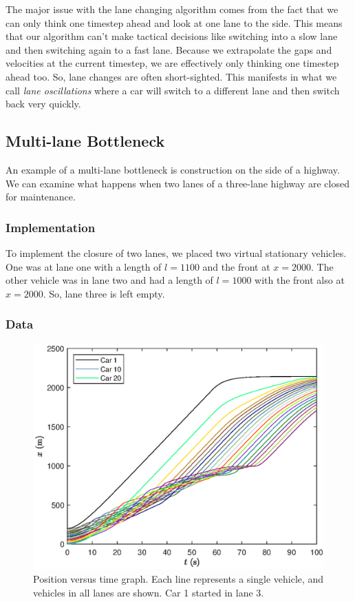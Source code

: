 \documentclass[12pt]{article}
\begin{document}
    The major issue with the lane changing algorithm comes from the fact that we can only think one timestep ahead and look at one lane to the side. This means that our algorithm can't make tactical decisions like switching into a slow lane and then switching again to a fast lane. Because we extrapolate the gaps and velocities at the current timestep, we are effectively only thinking one timestep ahead too. So, lane changes are often short-sighted. This manifests in what we call \textit{lane oscillations} where a car will switch to a different lane and then switch back very quickly. 
    
    \subsection{Multi-lane Bottleneck}
    An example of a multi-lane bottleneck is construction on the side of a highway. We can examine what happens when two lanes of a three-lane highway are closed for maintenance. 
    \subsubsection{Implementation}
    To implement the closure of two lanes, we placed two virtual stationary vehicles. One was at lane one with a length of $l=1100$ and the front at $x=2000$. The other vehicle was in lane two and had a length of $l=1000$ with the front also at $x=2000$. So, lane three is left empty.
    \subsubsection{Data}

    \begin{figure}[H]
      \begin{center}
        \includegraphics[width=13cm]{mlbn_x.eps}
        \caption{Position versus time graph. Each line represents a single vehicle, and vehicles in all lanes are shown. Car 1 started in lane 3.}
        \label{fig:multi lane x}
      \end{center}
    \end{figure}
\end{document}
